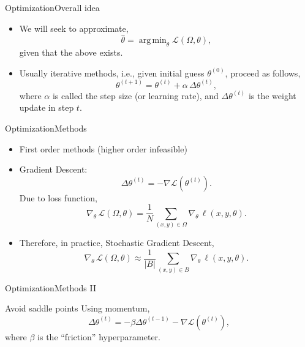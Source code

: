 \documentclass{beamer}
\newcommand{\loss}{\mathcal{L}}
\DeclareMathOperator*{\argmin}{arg\,min}
\begin{document}
\begin{frame}{Optimization}{Overall idea}
  \begin{itemize}
    \item We will seek to approximate,
    \begin{equation}
      \hat{\theta} = \argmin_{\theta} \loss(\Omega, \theta),
    \end{equation}
    given that the above exists.
    \item Usually iterative methods, i.e., given initial guess
    \(\theta^{(0)}\), proceed as follows,
    \begin{equation}
      \theta^{(t + 1)} = \theta^{(t)} + \alpha\,\Delta\theta^{(t)},
    \end{equation}
    where \(\alpha\) is called the step size (or learning rate), and
    \(\Delta\theta^{(t)}\) is the weight update in step \(t\).
  \end{itemize}
\end{frame}

\begin{frame}{Optimization}{Methods}
  \begin{itemize}
    \item First order methods (higher order infeasible)
    \item Gradient Descent:
    \begin{equation}
      \Delta\theta^{(t)} = -\nabla\loss(\theta^{(t)}).
    \end{equation}
    Due to loss function,
    \begin{equation}
      \nabla_{\theta}\,\loss(\Omega, \theta) =
      \frac{1}{N} \sum_{(x, y) \in \Omega} \nabla_{\theta}\,\ell (x, y, \theta).
    \end{equation}
    \item Therefore, in practice, \alert{Stochastic} Gradient Descent,
    \begin{equation}
      \nabla_{\theta}\,\loss(\Omega, \theta) \approx
      \frac{1}{\lvert B\rvert} \sum_{(x, y) \in B} \nabla_{\theta}\,\ell (x, y, \theta).
    \end{equation}
  \end{itemize}
\end{frame}

\begin{frame}{Optimization}{Methods II}
  \begin{alertblock}{Avoid saddle points}
    Using momentum,
    \begin{equation}
      \Delta\theta^{(t)} =
      -\beta\Delta\theta^{(t-1)} -\nabla\loss(\theta^{(t)}),
    \end{equation}
    where \(\beta\) is the ``friction'' hyperparameter.
  \end{alertblock}
\end{frame}
\end{document}
